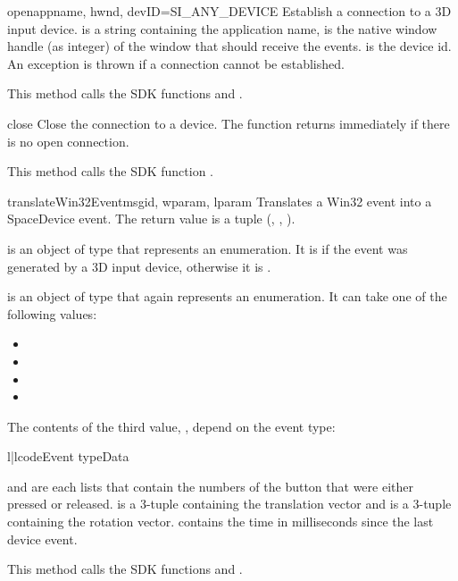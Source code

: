 \begin{methoddesc}{open}{appname, hwnd, devID=SI_ANY_DEVICE}
Establish a connection to a 3D input device.  is a string
containing the application name,  is the native window handle 
(as integer) of the window that should receive the events. 
is the device id. An exception is thrown if a connection cannot be
established.

This method calls the SDK functions  and
.
\end{methoddesc}

\begin{methoddesc}{close}{}
Close the connection to a device. The function returns immediately if
there is no open connection.

This method calls the SDK function .
\end{methoddesc}

\begin{methoddesc}{translateWin32Event}{msgid, wparam, lparam}
Translates a Win32 event into a SpaceDevice event. The return value is
a tuple (, , ).

 is an object of type
 that represents an enumeration. It is 
 if the event was generated by a 3D input device,
otherwise it is .

 is an object of type  that again represents
an enumeration. It can take one of the following values:

\begin{itemize}
\item {}
\item {}
\item {}
\item {}
\end{itemize}

The contents of the third value, , depend on the event type:

\begin{tableii}{l|l}{code}{Event type}{Data}
\end{tableii}

 and  are each lists that contain the numbers
of the button that were either pressed or released. 
is a 3-tuple containing the translation vector and  is a
3-tuple containing the rotation vector.  contains the time
in milliseconds since the last device event.

This method calls the SDK functions  and
.
\end{methoddesc}

